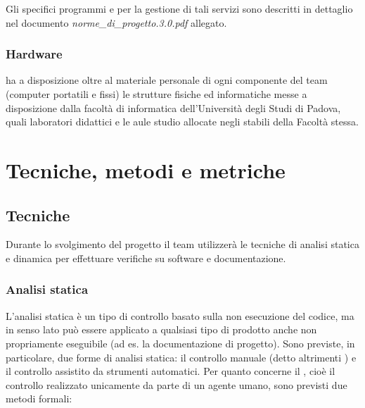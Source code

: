 Gli specifici programmi e  per la gestione di tali servizi sono descritti in dettaglio nel documento \textit{norme\_di\_progetto.3.0.pdf} allegato.

\subsubsection{Hardware}
\team{} ha a disposizione oltre al materiale personale di ogni componente del team (computer portatili e fissi) le strutture fisiche ed informatiche messe a disposizione dalla facoltà di informatica dell'Università degli Studi di Padova, quali laboratori didattici e le aule studio allocate negli stabili della Facoltà stessa.
\clearpage


\section{Tecniche, metodi e metriche}

\subsection{Tecniche}
Durante lo svolgimento del progetto il team utilizzerà le tecniche di analisi statica e dinamica per effettuare verifiche su software e documentazione.

\subsubsection{Analisi statica} 
L'analisi statica è un tipo di controllo basato sulla non esecuzione del codice, ma in senso lato può essere applicato a qualsiasi tipo di prodotto anche non propriamente eseguibile (ad es. la documentazione di progetto). Sono previste, in particolare, due forme di analisi statica: il controllo manuale (detto altrimenti ) e il controllo assistito da strumenti automatici.
Per quanto concerne il , cioè il controllo realizzato unicamente da parte di un agente umano, sono previsti due metodi formali:

